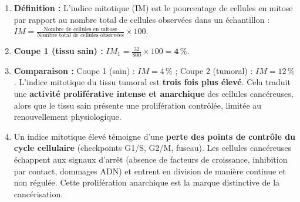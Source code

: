 \documentclass[11pt]{article}
\begin{document}
\begin{corrige}
\begin{enumerate}
\item \textbf{Définition :} L'indice mitotique (IM) est le pourcentage de cellules en mitose par rapport au nombre total de cellules observées dans un échantillon : $IM = \frac{\text{Nombre de cellules en mitose}}{\text{Nombre total de cellules observées}} \times 100$.

\item \textbf{Coupe 1 (tissu sain) :} $IM_1 = \frac{32}{800} \times 100 = \mathbf{4\,\%}$.

\item \textbf{Comparaison :} Coupe 1 (sain) : $IM = 4\,\%$ ; Coupe 2 (tumoral) : $IM = 12\,\%$.
L'indice mitotique du tissu tumoral est \textbf{trois fois plus élevé}. Cela traduit une \textbf{activité proliférative intense et anarchique} des cellules cancéreuses, alors que le tissu sain présente une prolifération contrôlée, limitée au renouvellement physiologique.

\item Un indice mitotique élevé témoigne d'une \textbf{perte des points de contrôle du cycle cellulaire} (checkpoints G1/S, G2/M, fuseau). Les cellules cancéreuses échappent aux signaux d'arrêt (absence de facteurs de croissance, inhibition par contact, dommages ADN) et entrent en division de manière continue et non régulée. Cette prolifération anarchique est la marque distinctive de la cancérisation.
\end{enumerate}
\end{corrige}
\end{document}
